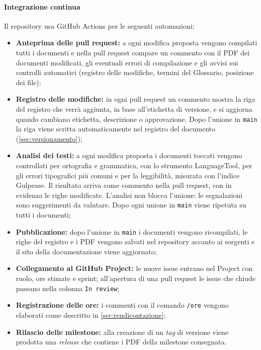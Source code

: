 \documentclass[documento]{gpt}
\begin{document}
	\paragraph{Integrazione continua}
	Il repository usa GitHub Actions per le seguenti automazioni:
	\begin{itemize}
		\item \textbf{Anteprima delle pull request:} a ogni modifica proposta
		vengono compilati tutti i documenti e nella pull request compare un
		commento con il PDF dei documenti modificati, gli eventuali errori di
		compilazione e gli avvisi sui controlli automatici (registro delle
		modifiche, termini del Glossario, posizione dei file);
		\item \textbf{Registro delle modifiche:} in ogni pull request un
		commento mostra la riga del registro che verrà aggiunta, in base
		all'etichetta di versione, e si aggiorna quando cambiano etichetta,
		descrizione o approvazione. Dopo l'unione in \texttt{main} la riga
		viene scritta automaticamente nel registro del documento
		(\autoref{sec:versionamento});
		\item \textbf{Analisi dei testi:} a ogni modifica proposta i documenti
		toccati vengono controllati per ortografia e grammatica, con lo
		strumento LanguageTool, per gli errori tipografici più comuni e per la
		leggibilità, misurata con l'indice Gulpease. Il risultato arriva come
		commento nella pull request, con in evidenza le righe modificate.
		L'analisi non blocca l'unione: le segnalazioni sono suggerimenti da
		valutare. Dopo ogni unione in \texttt{main} viene ripetuta su tutti i
		documenti;
		\item \textbf{Pubblicazione:} dopo l'unione in \texttt{main} i documenti
		vengono ricompilati, le righe del registro e i PDF vengono salvati nel
		repository accanto ai sorgenti e il sito della documentazione viene
		aggiornato;
		\item \textbf{Collegamento al GitHub Project:} le nuove issue entrano
		nel Project con ruolo, ore stimate e sprint; all'apertura di una pull
		request le issue che chiude passano nella colonna \texttt{In review};
		\item \textbf{Registrazione delle ore:} i commenti con il comando
		\texttt{/ore} vengono elaborati come descritto in
		\autoref{sec:rendicontazione};
		\item \textbf{Rilascio delle milestone:} alla creazione di un
		\textit{tag} di versione viene prodotta una \textit{release} che
		contiene i PDF della milestone consegnata.
	\end{itemize}
	
\end{document}
